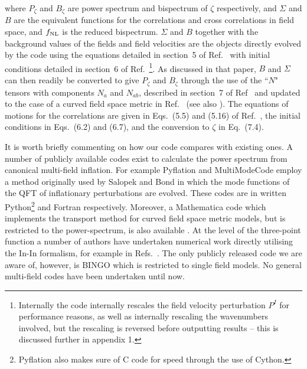 \documentclass[10pt,
amsmath,amssymb,
aps,prd,nofootinbib,eqsecnum,a4paper]{revtex4}
\begin{document}
where $P_\zeta$ and $B_\zeta$ are power spectrum and bispectrum of $\zeta$ respectively, 
and $\Sigma$ and $B$ are 
the equivalent functions for the correlations and cross correlations in field space, and $f_{\rm NL}$ is 
the reduced bispectrum.
$\Sigma$ and $B$ together with the background 
values of the fields and field velocities are the objects directly evolved by the code using the equations 
detailed in section~5 of Ref.~\cite{Dias:2016rjq} with 
initial conditions 
detailed in section~6 of Ref.~\cite{Dias:2016rjq}\footnote{Internally the code internally rescales 
the field velocity perturbation $P^I$ for 
performance reasons, as well as internally rescaling the wavenumbers involved, but the rescaling is reversed before 
outputting results -- this is discussed further in appendix 1.}. As 
discussed in that paper, $B$ and $\Sigma$ can then 
readily be converted to give $P_\zeta$ and $B_\zeta$ through the use of the ``$N$" tensors with components $N_a$ and $N_{ab}$, 
described in section~7 of Ref~\cite{Dias:2016rjq} and updated to the case of a curved field space metric in Ref.~\cite{xxx2} (see also \cite{Dias:2014msa}). 
The equations of motions for the correlations 
are given in Eqs.~(5.5) and (5.16) of  Ref.~\cite{Dias:2016rjq}, the initial conditions in Eqs.~(6.2) and (6.7),
and the conversion to $\zeta$ in 
Eq.~(7.4). 


It is worth briefly commenting on how our code compares with existing ones. A number of publicly available 
codes exist to calculate the power spectrum from canonical multi-field inflation. 
For example Pyflation \cite{Huston:2011fr} and 
MultiModeCode \cite{Price:2014xpa} employ a method originally used by Salopek and Bond \cite{Salopek:1988qh}
in which the mode functions of the QFT of inflationary perturbations are evolved. These codes are 
in written Python\footnote{Pyflation also makes sure of C code for speed through the use of Cython.} and Fortran respectively.
Moreover, a Mathematica code which implements the transport method for curved field space 
metric models, but is restricted to the power-spectrum, is also available
\cite{Dias:2015rca}. At the level of the three-point function a number of authors 
have undertaken numerical work directly utilising 
the In-In formalism, for example in Refs.~\cite{Chen:2006xjb,Chen:2008wn, Hazra:2012yn,Funakoshi:2012ms,Horner:2013sea}. 
The only publicly released code we are aware of, however, is BINGO \cite{Hazra:2012yn} which is restricted to single field models. 
No general multi-field codes have been undertaken until now.
\end{document}
